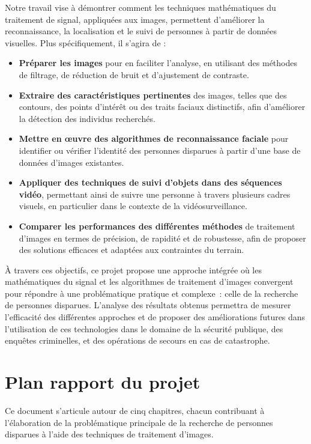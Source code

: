 \documentclass[a4paper,12pt]{report}
\begin{document}
Notre travail vise à démontrer comment les techniques mathématiques du traitement de signal, appliquées aux images, permettent d'améliorer la reconnaissance, la localisation et le suivi de personnes à partir de données visuelles. Plus spécifiquement, il s'agira de :

\begin{itemize}
    \item \textbf{Préparer les images} pour en faciliter l'analyse, en utilisant des méthodes de filtrage, de réduction de bruit et d'ajustement de contraste.
    \item \textbf{Extraire des caractéristiques pertinentes} des images, telles que des contours, des points d'intérêt ou des traits faciaux distinctifs, afin d'améliorer la détection des individus recherchés.
    \item \textbf{Mettre en œuvre des algorithmes de reconnaissance faciale} pour identifier ou vérifier l'identité des personnes disparues à partir d'une base de données d'images existantes.
    \item \textbf{Appliquer des techniques de suivi d'objets dans des séquences vidéo}, permettant ainsi de suivre une personne à travers plusieurs cadres visuels, en particulier dans le contexte de la vidéosurveillance.
    \item \textbf{Comparer les performances des différentes méthodes} de traitement d'images en termes de précision, de rapidité et de robustesse, afin de proposer des solutions efficaces et adaptées aux contraintes du terrain.
\end{itemize}

À travers ces objectifs, ce projet propose une approche intégrée où les mathématiques du signal et les algorithmes de traitement d'images convergent pour répondre à une problématique pratique et complexe : celle de la recherche de personnes disparues. L'analyse des résultats obtenus permettra de mesurer l'efficacité des différentes approches et de proposer des améliorations futures dans l'utilisation de ces technologies dans le domaine de la sécurité publique, des enquêtes criminelles, et des opérations de secours en cas de catastrophe.

\section*{Plan rapport du projet}
Ce document s’articule autour de cinq chapitres, chacun contribuant à l’élaboration de la problématique principale de la recherche de personnes disparues à l’aide des techniques de traitement d’images.
\end{document}
